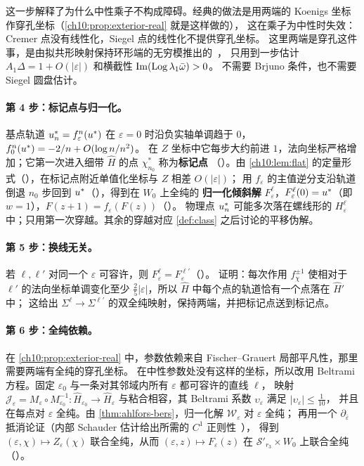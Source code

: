 这一步解释了为什么中性乘子不构成障碍。经典的做法是用两端的 Koenigs 坐标作穿孔坐标（\cref{ch10:prop:exterior-real} 就是这样做的），
这在乘子为中性时失效：Cremer 点没有线性化，Siegel 点的线性化不提供穿孔坐标。
这里两端是穿孔这件事，是由拟共形映射保持环形端的无穷模推出的~\cite{LehtoVirtanen}，
只用到一步估计 $A_1\Delta=1+O(|\varepsilon|)$ 和横截性 $\operatorname{Im}(\operatorname{Log}\lambda_1\bar\omega)>0$。
不需要 Brjuno 条件，也不需要 Siegel 圆盘估计。

\paragraph{第 4 步：标记点与归一化。}
基点轨道 $u^{*}_n=f^n_\varepsilon(u^{*})$ 在 $\varepsilon=0$ 时沿负实轴单调趋于 $0$，$f_0^n(u^{*})=-2/n+O(\log n/n^2)$。
在 $Z$ 坐标中它每步大约前进 $1$，法向坐标严格增加；它第一次进入细带 $\hat H$ 的点 $\chi^*_{n_0}$ 称为\textbf{标记点}
（\cite[引理~10.5]{KneserPaper}）。由 \cref{ch10:lem:flat} 的定量形式（\cite[引理~10.4(2)]{KneserPaper}），在标记点附近单值化坐标与 $Z$ 相差 $O(|\varepsilon|)$；
用 $f_\varepsilon$ 的主值逆分支沿轨道倒退 $n_0$ 步回到 $u^{*}$（\cite[引理~10.6]{KneserPaper}），得到在 $W_0$ 上全纯的
\textbf{归一化倾斜解} $F^\ell_\varepsilon$，$F^\ell_\varepsilon(0)=u^{*}$（即 $w=1$），$F(z+1)=f_\varepsilon(F(z))$（\cite[定义~10.7]{KneserPaper}）。
物理点 $u^{*}_n$ 可能多次落在螺线形的 $H^\ell_\varepsilon$ 中；只用第一次穿越。其余的穿越对应 \cref{def:class} 之后讨论的平移伪解。

\paragraph{第 5 步：换线无关。}
若 $\ell,\ell'$ 对同一个 $\varepsilon$ 可容许，则 $F^\ell_\varepsilon=F^{\ell'}_\varepsilon$（\cite[引理~10.8]{KneserPaper}）。
证明：每次作用 $f_\chi^{\pm1}$ 使相对于 $\ell'$ 的法向坐标单调变化至少 $\tfrac25|\varepsilon|$，所以 $\hat H$ 中每个点的轨道恰有一个点落在 $\hat H'$ 中；
这给出 $\Sigma^\ell\to\Sigma^{\ell'}$ 的双全纯映射，保持两端，并把标记点送到标记点。

\paragraph{第 6 步：全纯依赖。}
在 \cref{ch10:prop:exterior-real} 中，参数依赖来自 Fischer--Grauert 局部平凡性，那里需要两端有全纯的穿孔坐标。
在中性参数处没有这样的坐标，所以改用 Beltrami 方程。固定 $\varepsilon_0$ 与一条对其邻域内所有 $\varepsilon$ 都可容许的直线 $\ell$，
映射 $\mathcal J_\varepsilon=M_\varepsilon\circ M_{\varepsilon_0}^{-1}:\hat H_{\varepsilon_0}\to\hat H_\varepsilon$ 与粘合相容，其 Beltrami 系数 $\upsilon_\varepsilon$ 满足 $|\upsilon_\varepsilon|\le\tfrac1{10}$，
并且在每点对 $\varepsilon$ 全纯。由 \cref{thm:ahlfors-bers}，归一化解 $\mathcal W_\varepsilon$ 对 $\varepsilon$ 全纯；
再用一个 $\partial_{\bar\varepsilon}$ 抵消论证（内部 Schauder 估计给出所需的 $C^1$ 正则性~\cite[第~V~章]{AhlforsLectures}），
得到 $(\varepsilon,\chi)\mapsto Z_\varepsilon(\chi)$ 联合全纯，从而 $(\varepsilon,z)\mapsto F_\varepsilon(z)$ 在 $\mathcal S'_{r_3}\times W_0$ 上联合全纯
（\cite[命题~10.9]{KneserPaper}）。

